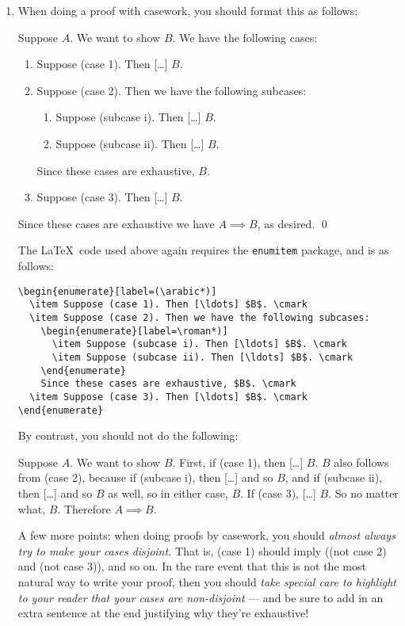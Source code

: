 \documentclass{fkpset}
\begin{document}
\begin{enumerate}[label=(\arabic*)]
\item When doing a proof with casework, you should format this as follows:
  \begin{leftbar}
    Suppose $A$. We want to show $B$. We have the following cases:
    \begin{enumerate}[label=(\arabic*)]
    \item Suppose (case 1). Then [\ldots] $B$. \cmark
    \item Suppose (case 2). Then we have the following subcases:
      \begin{enumerate}[label=\roman*)]
      \item Suppose (subcase i). Then [\ldots] $B$. \cmark
      \item Suppose (subcase ii). Then [\ldots] $B$. \cmark
      \end{enumerate}
      Since these cases are exhaustive, $B$. \cmark
    \item Suppose (case 3). Then [\ldots] $B$. \cmark
    \end{enumerate}
    Since these cases are exhaustive we have $A \implies B$, as desired.
    \qed
  \end{leftbar}
  The \LaTeX\ code used above again requires the \texttt{enumitem} package,
  and is as follows:
  \begin{lstlisting}
\begin{enumerate}[label=(\arabic*)]
  \item Suppose (case 1). Then [\ldots] $B$. \cmark
  \item Suppose (case 2). Then we have the following subcases:
    \begin{enumerate}[label=\roman*)]
      \item Suppose (subcase i). Then [\ldots] $B$. \cmark
      \item Suppose (subcase ii). Then [\ldots] $B$. \cmark
    \end{enumerate}
    Since these cases are exhaustive, $B$. \cmark
  \item Suppose (case 3). Then [\ldots] $B$. \cmark
\end{enumerate}\end{lstlisting}\vspace{-3em}
  By contrast, you should not do the following:
  \begin{leftbar}
    Suppose $A$. We want to show $B$. First, if (case 1), then [\ldots] $B$. $B$
    also follows from (case 2), because if (subcase i), then [\ldots] and so
    $B$, and if (subcase ii), then [\ldots] and so $B$ as well, so in either
    case, $B$. If (case 3), [\ldots] $B$. So no matter what, $B$. Therefore $A
    \implies B$.
  \end{leftbar}
  A few more points: when doing proofs by casework, you should
  \emph{almost always try to make your cases disjoint.} That is, (case 1)
  should imply ((not case 2) and (not case 3)), and so on. In the rare event
  that this is not the most natural way to write your proof, then you
  should \emph{take special care to highlight to your reader that your cases are
    non-disjoint} --- and be sure to add in an extra sentence at the end
  justifying why they're exhaustive!


\end{enumerate}
\end{document}
